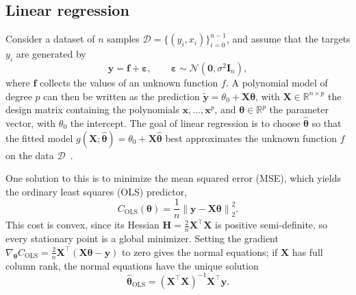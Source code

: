 \subsection{Linear regression}\label{subsec:linear-regression}

Consider a dataset of $n$ samples $\mathcal{D}=\{ (y_i,x_i) \}^{n-1}_{i=0}$, and assume
that the targets $y_i$ are generated by
\begin{equation}\label{eq:data-generating-process}
    \bm{y} = \bm{f} + \bm{\varepsilon}, \qquad
    \bm{\varepsilon} \sim \mathcal{N}(\bm{0}, \sigma^2\bm{I}_n),
\end{equation}
where $\bm{f}$ collects the values of an unknown function $f$. A polynomial model of
degree $p$ can then be written as the prediction $\bm{\tilde{y}}=\theta_0 + \bm{X\theta}$,
with $\bm{X} \in \mathbb{R}^{n \times p}$ the design matrix containing the polynomials
$\bm{x},\dots, \bm{x}^p$, and $\bm{\theta} \in \mathbb{R}^p$ the parameter vector, with
$\theta_0$ the intercept. The goal of linear regression is to choose $\bm{\hat{\theta}}$
so that the fitted model $g(\bm{X}; \bm{\hat{\theta}})=\theta_0 + \bm{X\hat{\theta}}$
best approximates the unknown function $f$ on the data $\mathcal{D}$~\cite{hjorth-jensen_2026,mehta_2019}.

One solution to this is to minimize the mean squared error (MSE), which yields the
ordinary least squares (OLS) predictor,
\begin{equation}\label{eq:ols-cost}
    C_\text{OLS}(\bm{\theta}) = \frac{1}{n}\left\lVert \bm{y}
    - \bm{X}\bm{\theta} \right\rVert_2^2 .
\end{equation}
This cost is convex, since its Hessian $\bm{H} = \frac{2}{n}\bm{X}^\top\bm{X}$ is positive
semi-definite, so every stationary point is a global minimizer. Setting the gradient
$\nabla_{\bm{\theta}} C_\text{OLS} = \frac{2}{n}\bm{X}^\top
(\bm{X}\bm{\theta} - \bm{y})$ to zero gives the normal equations; if
$\bm{X}$ has full column rank, the normal equations have the unique solution
\begin{equation}\label{eq:ols-theta-hat}
    \hat{\bm{\theta}}_\text{OLS} = (\bm{X}^\top \bm{X})^{-1} \bm{X}^\top \bm{y}.
\end{equation}

